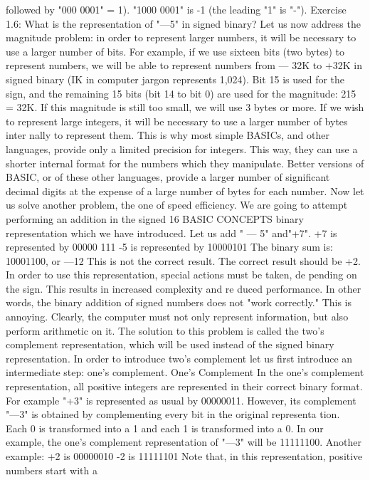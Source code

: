 \documentclass{book}
\begin{document}
followed by "000 0001" = 1).
"1000 0001" is -1 (the leading "1" is "-").
Exercise 1.6: What is the representation of "—5" in signed binary?
Let us now address the magnitude problem: in order to represent
larger numbers, it will be necessary to use a larger number of bits.
For example, if we use sixteen bits (two bytes) to represent
numbers, we will be able to represent numbers from — 32K to
+32K in signed binary (IK in computer jargon represents 1,024).
Bit 15 is used for the sign, and the remaining 15 bits (bit 14 to bit
0) are used for the magnitude: 215 = 32K. If this magnitude is still
too small, we will use 3 bytes or more. If we wish to represent large
integers, it will be necessary to use a larger number of bytes inter
nally to represent them. This is why most simple BASICs, and
other languages, provide only a limited precision for integers. This
way, they can use a shorter internal format for the numbers which
they manipulate. Better versions of BASIC, or of these other
languages, provide a larger number of significant decimal digits at
the expense of a large number of bytes for each number.
Now let us solve another problem, the one of speed efficiency.
We are going to attempt performing an addition in the signed
16
BASIC CONCEPTS
binary representation which we have introduced. Let us add " — 5"
and"+7".
+7 is represented by 00000 111
-5 is represented by 10000101
The binary sum is: 10001100, or —12
This is not the correct result. The correct result should be +2. In
order to use this representation, special actions must be taken, de
pending on the sign. This results in increased complexity and re
duced performance. In other words, the binary addition of signed
numbers does not "work correctly." This is annoying. Clearly, the
computer must not only represent information, but also perform
arithmetic on it.
The solution to this problem is called the two's complement
representation, which will be used instead of the signed binary
representation. In order to introduce two's complement let us first
introduce an intermediate step: one's complement.
One's Complement
In the one's complement representation, all positive integers are
represented in their correct binary format. For example "+3" is
represented as usual by 00000011. However, its complement "—3"
is obtained by complementing every bit in the original representa
tion. Each 0 is transformed into a 1 and each 1 is transformed into
a 0. In our example, the one's complement representation of "—3"
will be 11111100.
Another example:
+2 is 00000010
-2 is 11111101
Note that, in this representation, positive numbers start with a
\end{document}
